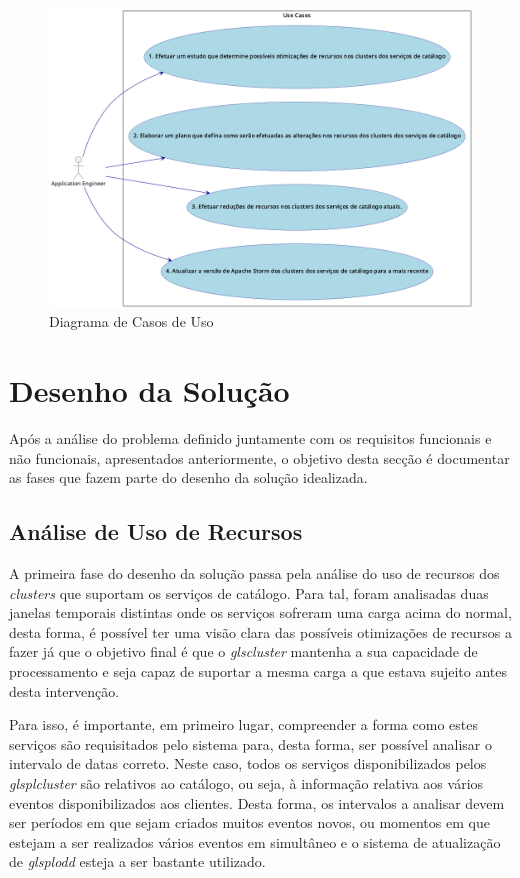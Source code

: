 \begin{figure}[H]
  \centerline{\includegraphics[scale=0.4]{media/content/analise/ucd.png}}
  \caption{Diagrama de Casos de Uso}
  \label{dcu}
\end{figure}

\section{Desenho da Solução}

Após a análise do problema definido juntamente com os requisitos funcionais e não funcionais,
apresentados anteriormente, o objetivo desta secção é documentar as fases que fazem parte do
desenho da solução idealizada.

\subsection{Análise de Uso de Recursos}

A primeira fase do desenho da solução passa pela análise do uso de recursos dos \textit{\glspl{cluster}}
que suportam os serviços de catálogo. Para tal, foram analisadas duas janelas temporais distintas
onde os serviços sofreram uma carga acima do normal, desta forma, é possível ter uma visão clara
das possíveis otimizações de recursos a fazer já que o objetivo final é que o \textit{gls{cluster}}
mantenha a sua capacidade de processamento e seja capaz de suportar a mesma carga a que estava
sujeito antes desta intervenção.

Para isso, é importante, em primeiro lugar, compreender a forma como estes serviços são requisitados
pelo sistema para, desta forma, ser possível analisar o intervalo de datas correto. Neste caso,
todos os serviços disponibilizados pelos \textit{glspl{cluster}} são relativos ao catálogo, ou seja,
à informação relativa aos vários eventos disponibilizados aos clientes. Desta forma, os intervalos
a analisar devem ser períodos em que sejam criados muitos eventos novos, ou momentos em que
estejam a ser realizados vários eventos em simultâneo e o sistema de atualização de \textit{glspl{odd}}
esteja a ser bastante utilizado.

